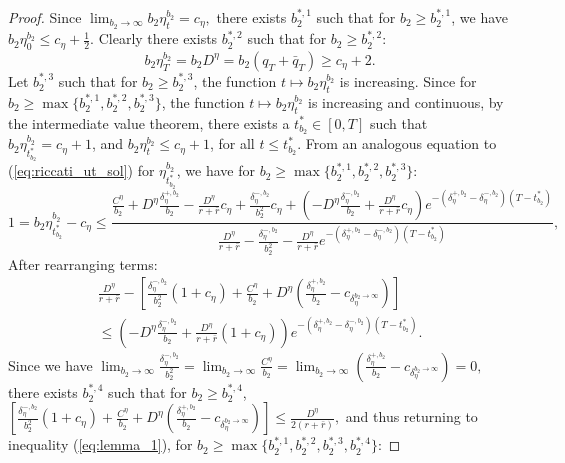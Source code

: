 \documentclass[11pt]{article}
\begin{document}
\begin{proof}
	Since $\lim_{b_2 \to \infty}b_2\eta^{b_2}_t= c_\eta,$ there exists $b_2^{*,1}$ such that for $b_2 \geq b_2^{*,1}$, we have
	$b_2\eta^{b_2}_0 \leq c_\eta+\frac{1}{2}.$
	Clearly there exists $b_2^{*,2}$ such that for $b_2 \geq b_2^{*,2}$:
	$$b_2\eta^{b_2}_T=b_2D^\eta=b_2(q_T+\bar{q}_T)\geq c_\eta+2.$$
	Let $b_2^{*,3}$ such that for $b_2 \geq b_2^{*,3}$, the function $t \mapsto b_2 \eta^{b_2}_t$ is increasing. Since for $b_2 \geq \max \{b_2^{*,1},b_2^{*,2},b_2^{*,3} \}$, the function $t \mapsto b_2 \eta^{b_2}_t$ is increasing and continuous, by the intermediate value theorem, there exists a $t^*_{b_2}\in[0,T]$ such that
	$b_2 \eta^{b_2}_{t^*_{b_2}} =c_\eta+1$, and $b_2 \eta^{b_2}_t \leq c_\eta+1$, for all $t\leq t^*_{b_2}.$
	From an analogous equation to (\ref{eq:riccati_ut_sol}) for $\eta^{b_2}_{t^*_{b_2}}$, we have for $b_2 \geq \max \{b_2^{*,1},b_2^{*,2},b_2^{*,3} \}$:
	$$
	1=b_2\eta^{b_2}_{t^*_{b_2}}-c_\eta\leq \frac{ \frac{C^\eta}{b_2}+D^\eta\frac{\delta^{+,b_2}_\eta}{b_2}-\frac{D^\eta}{r+\bar{r}}c_\eta +\frac{\delta^{-,b_2}_\eta}{b_2^2}c_\eta+\left(-D^\eta\frac{\delta^{-,b_2}_\eta}{b_2} +\frac{D^\eta}{r+\bar{r}}c_\eta\right)e^{-(\delta^{+,b_2}_\eta-\delta^{-,b_2}_\eta)(T-t^*_{b_2})} }{ \frac{D^\eta}{r+\bar{r}} -\frac{\delta^{-,b_2}_\eta}{b_2^2} -\frac{D^\eta}{r+\bar{r}} e^{-(\delta^{+,b_2}_\eta-\delta^{-,b_2}_\eta)(T-t^*_{b_2})}},
	$$
	After rearranging terms:
	\begin{equation}
	\begin{split}
	\frac{D^\eta}{r+\bar{r}}-\left[\frac{\delta^{-,b_2}_\eta}{b_2^2}(1+c_\eta)+\frac{C^\eta}{b_2}+D^\eta \left(\frac{\delta^{+,b_2}_\eta}{b_2}-c_{\delta^{b_2 \to \infty}_\eta} \right)\right]\\
	\leq  \left(-D^\eta\frac{\delta^{-,b_2}_\eta }{b_2}+\frac{D^\eta}{r+\bar{r}}(1+c_\eta) \right) e^{-\left(\delta^{+,b_2}_\eta -\delta^{-,b_2}_\eta\right)(T-t^*_{b_2})}.
	\end{split}
	\label{eq:lemma_1}
	\end{equation}
	Since we have
	$\lim_{b_2 \to \infty}\frac{\delta^{-,b_2}_\eta}{b_2^2}=\lim_{b_2 \to \infty}\frac{C^\eta}{b_2}=\lim_{b_2 \to \infty}\left(\frac{\delta^{+,b_2}_\eta}{b_2}-c_{\delta^{b_2 \to \infty}_\eta} \right) =0,$ there exists $b_2^{*,4}$ such that for $b_2 \geq b_2^{*,4}$,
	$\left[\frac{\delta^{-,b_2}_\eta}{b_2^2}(1+c_\eta)+\frac{C^\eta}{b_2}+D^\eta \left(\frac{\delta^{+,b_2}_\eta}{b_2}-c_{\delta^{b_2 \to \infty}_\eta} \right)\right] \leq \frac{D^\eta}{2(r+\bar{r})},$
	and thus returning to inequality (\ref{eq:lemma_1}), for $b_2 \geq \max \{b_2^{*,1},b_2^{*,2},b_2^{*,3},b_2^{*,4} \}$:

\end{proof}
\end{document}

